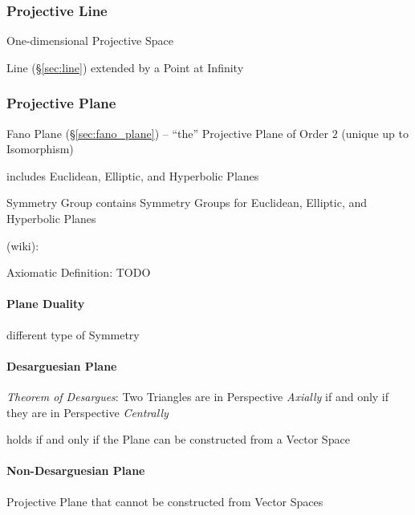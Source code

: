 \subsubsection{Projective Line}\label{sec:projective_line}

One-dimensional Projective Space

Line (\S\ref{sec:line}) extended by a Point at Infinity



\subsubsection{Projective Plane}\label{sec:projective_plane}

Fano Plane (\S\ref{sec:fano_plane}) -- ``the'' Projective Plane of Order $2$
(unique up to Isomorphism)

includes Euclidean, Elliptic, and Hyperbolic Planes

Symmetry Group contains Symmetry Groups for Euclidean, Elliptic, and
Hyperbolic Planes

(wiki):

Axiomatic Definition: TODO



\paragraph{Plane Duality}\label{sec:plane_duality}\hfill

different type of Symmetry %



\paragraph{Desarguesian Plane}\label{sec:desarguesian_plane}\hfill

\emph{Theorem of Desargues}: Two Triangles are in Perspective \emph{Axially} if
and only if they are in Perspective \emph{Centrally}

holds if and only if the Plane can be constructed from a Vector Space



\paragraph{Non-Desarguesian Plane}\label{sec:non_desarguesian}\hfill

Projective Plane that cannot be constructed from Vector Spaces

